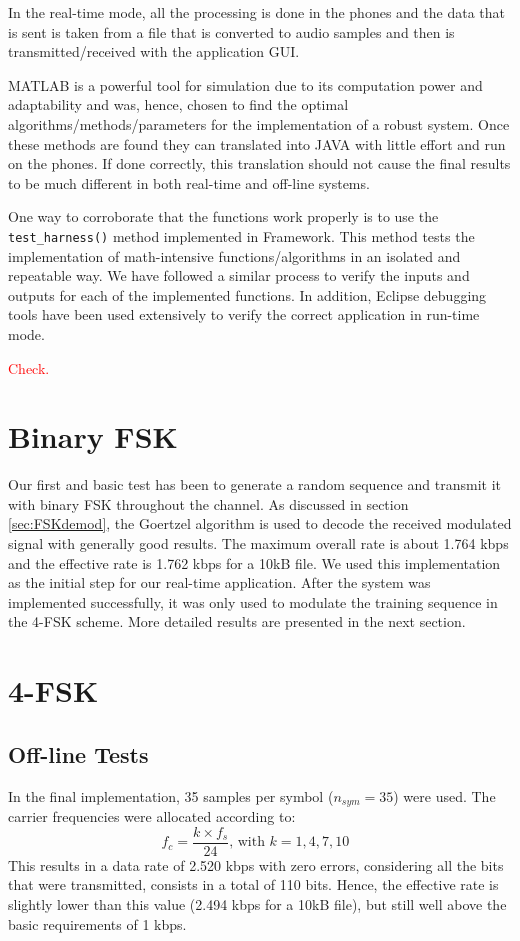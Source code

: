 \documentclass[12pt,a4paper,openright]{report}
\begin{document}
In the real-time mode, all the processing is done in the phones and the data that is sent is taken from a file that is converted to audio samples and then is transmitted/received with the application GUI. 

MATLAB is a powerful tool for simulation due to its computation power and adaptability and was, hence, chosen to find the optimal algorithms/methods/parameters for the implementation of a robust system. Once these methods are found they can translated into JAVA with little effort and run on the phones. If done correctly, this translation should not cause the final results to be much different in both real-time and off-line systems. 

One way to corroborate that the functions work properly is to use the \texttt{test\_harness()} method implemented in Framework. This method tests the implementation of math-intensive functions/algorithms in an isolated and repeatable way. We have followed a similar process to  verify the inputs and outputs for each of the implemented functions. In addition, Eclipse debugging tools have been used extensively to verify the correct application in run-time mode.
 

\textcolor{red}{Check.}%

\section{Binary FSK}
Our first and basic test has been to generate a random sequence and transmit it with binary FSK throughout the channel. As discussed in section \ref{sec:FSKdemod}, the Goertzel algorithm is used to decode the received modulated signal with generally good results. The maximum overall rate is about 1.764 kbps and the effective rate is 1.762 kbps for a 10kB file. We used this implementation as the initial step for our real-time application. After the system was implemented successfully, it was only used to modulate the training sequence in the 4-FSK scheme. More detailed results are presented in the next section. 


\section{4-FSK}
\subsection{Off-line Tests}
In the final implementation, 35 samples per symbol ($n_{sym}=35$) were used. The carrier frequencies were allocated according to:
\begin{equation}
{f_c} = \frac{{k \times {f_s}}}{{24}} \text{, with $k=1,4,7,10$ }
\end{equation} 
 This results in a data rate of 2.520 kbps with zero errors, considering all the bits that were transmitted, consists in a total of 110 bits. Hence, the effective rate is slightly lower than this value (2.494 kbps for a 10kB file), but still well above the basic requirements of 1 kbps. 
\end{document}
